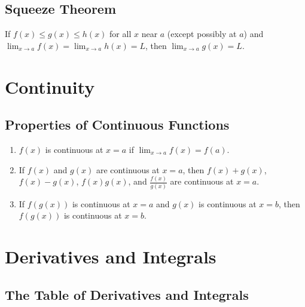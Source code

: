 \documentclass[12pt]{article}
\begin{document}
\subsection*{Squeeze Theorem}
If $f(x) \leq g(x) \leq h(x)$ for all $x$ near $a$ (except possibly at $a$) and $\lim_{x \to a} f(x) = \lim_{x \to a} h(x) = L$, then $\lim_{x \to a} g(x) = L$.

\section{Continuity}

\subsection*{Properties of Continuous Functions}

\begin{enumerate}
  \item $f(x)$ is continuous at $x=a$ if $\lim_{x \to a} f(x) = f(a)$.
  \item If $f(x)$ and $g(x)$ are continuous at $x=a$, then $f(x) + g(x)$, $f(x) - g(x)$, $f(x)g(x)$, and $\frac{f(x)}{g(x)}$ are continuous at $x=a$.
  \item If $f(g(x))$ is continuous at $x=a$ and $g(x)$ is continuous at $x=b$, then $f(g(x))$ is continuous at $x=b$.
\end{enumerate}


\section{Derivatives and Integrals}

\subsection*{The Table of Derivatives and Integrals}
\end{document}
